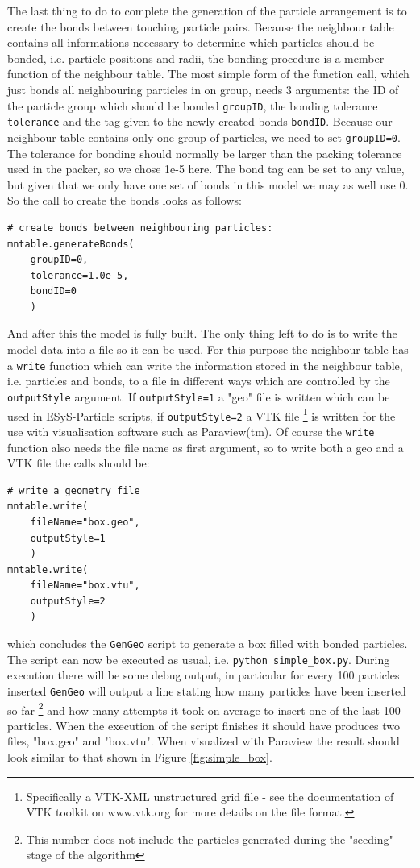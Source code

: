 The last thing to do to complete the generation of the particle arrangement is to create the bonds between touching particle pairs. Because the neighbour table contains all informations necessary to determine which particles should be bonded, i.e. particle positions and radii, the bonding procedure is a member function of the neighbour table. The most simple form of the function call, which just bonds all neighbouring particles in on group, needs 3 arguments: the ID of the particle group which should be bonded \texttt{groupID}, the bonding tolerance \texttt{tolerance} and the tag given to the newly created bonds \texttt{bondID}. Because our neighbour table contains only one group of particles, we need to set \texttt{groupID=0}. The tolerance for bonding should normally be larger than the packing tolerance used in the packer, so we chose 1e-5 here. The bond tag can be set to any value, but given that we only have one set of bonds in this model we may as well use 0. So the call to create the bonds looks as follows:  
\begin{verbatim}
# create bonds between neighbouring particles:
mntable.generateBonds(
    groupID=0,
    tolerance=1.0e-5,
    bondID=0
    )
\end{verbatim}
And after this the model is fully built. The only thing left to do is to write the model data into a file so it can be used. For this purpose the neighbour table has a \texttt{write} function which can write the information stored in the neighbour table, i.e. particles and bonds, to a file in different ways which are controlled by the \texttt{outputStyle} argument. If \texttt{outputStyle=1} a "geo" file is written which can be used in ESyS-Particle scripts, if  \texttt{outputStyle=2} a VTK file \footnote{Specifically a VTK-XML unstructured grid file - see the documentation of VTK toolkit on www.vtk.org for more details on the file format.} is written for the use with visualisation software such as Paraview(tm). Of course the \texttt{write} function also needs the file name as first argument, so to write both a geo and a VTK file the calls should be:
\begin{verbatim}
# write a geometry file
mntable.write(
    fileName="box.geo", 
    outputStyle=1
    )
mntable.write(
    fileName="box.vtu",
    outputStyle=2
    )
\end{verbatim}   
which concludes the \texttt{GenGeo} script to generate a box filled with bonded particles. The script can now be executed as usual, i.e. \texttt{python\ simple\_box.py}. During execution there will be some debug output, in particular for every 100 particles inserted \texttt{GenGeo} will output a line stating how many particles have been inserted so far \footnote{This number does not include the particles generated during the "seeding" stage of the algorithm} and how many attempts it took on average to insert one of the last 100 particles. When the execution of the script finishes it should have produces two files, "box.geo" and "box.vtu". When visualized with Paraview the result should look similar to that shown in Figure \ref{fig:simple_box}.  
